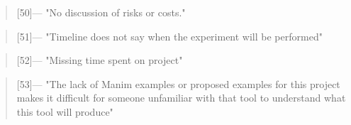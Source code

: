 \begin{quotation} [50]---%
  "No discussion of risks or costs."
\end{quotation}

\begin{quotation} [51]---%
  "Timeline does not say when the experiment will be performed"
\end{quotation}

\begin{quotation} [52]---%
  "Missing time spent on project"
\end{quotation}

\begin{quotation} [53]---%
  "The lack of Manim examples or proposed examples for this project makes it difficult for someone unfamiliar with that tool to understand what this tool will produce"
\end{quotation}


